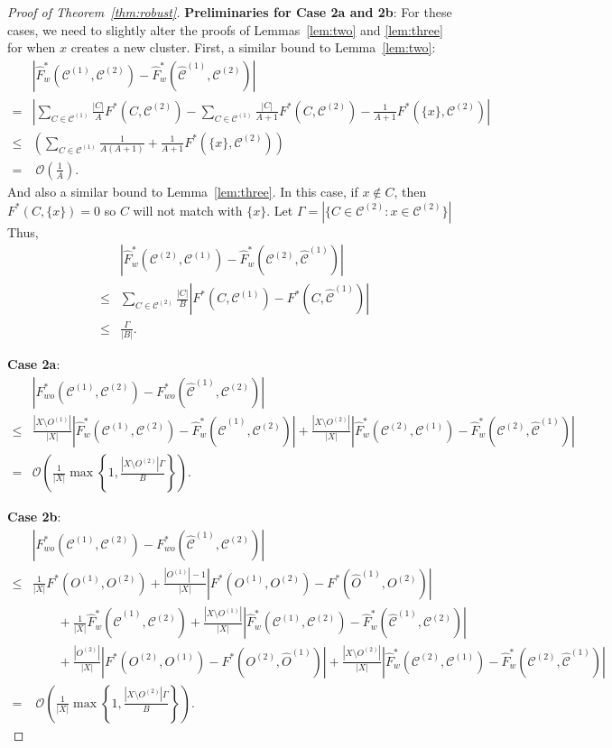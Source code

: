 \documentclass[10pt,a4paper]{amsart}
\newcommand{\bigO}{\mathcal{O}}
\newcommand\cCone{\mathcal{C}^{(1)}}
\newcommand\cCtwo{\mathcal{C}^{(2)}}
\newcommand\hcCone{\hat{\mathcal{C}}^{(1)}}
\begin{document}
\begin{proof}[Proof of Theorem~\ref{thm:robust}]
    \textbf{Preliminaries for Case 2a and 2b}:
    For these cases, we need to slightly alter the proofs of Lemmas~\ref{lem:two} and \ref{lem:three} for when $x$ creates a new cluster.
    First, a similar bound to Lemma~\ref{lem:two}:
    \begin{align*}
        & \left| \hat{F}^*_{w}(\cCone, \cCtwo) - \hat{F}^*_{w}(\hcCone, \cCtwo) \right| \\
        = & \left| \sum_{C \in \cCone} \frac{|C|}{A} F^*(C, \cCtwo) - \sum_{C \in \cCone} \frac{|C|}{A+1} F^*(C, \cCtwo) - \frac{1}{A+1} F^*(\{x\}, \cCtwo) \right| \\
        \leq & \left( \sum_{C \in \cCone} \frac{1}{A(A+1)} + \frac{1}{A+1} F^*(\{x\}, \cCtwo)\right) \\
        = & \; \bigO \left( \frac{1}{A} \right).
    \end{align*}
    And also a similar bound to Lemma~\ref{lem:three}.
    In this case, if $x \not \in C$, then $F^*(C, \{x\}) = 0$ so $C$ will not match with $\{x\}$.
    Let $\Gamma = |\{C \in \cCtwo : x \in \cCtwo\}|$
    Thus, 
    \begin{align*}
        & \left|\hat{F}^*_w(\cCtwo, \cCone) - \hat{F}^*_w(\cCtwo, \hcCone)\right|\\
        \leq & \sum_{C \in \cCtwo} \frac{|C|}{B} \left| F^*(C, \cCone) - F^*(C, \hcCone) \right| \\
        \leq & \frac{\Gamma}{|B|}.
    \end{align*}

    \textbf{Case 2a}:
    \begin{align*}
        & \left| F^*_{wo}(\cCone, \cCtwo) - F^*_{wo}(\hcCone, \cCtwo) \right| \\
        \leq & \frac{|X \setminus O^{(1)}|}{|X|}\left|\hat{F}^*_{w}(\cCone, \cCtwo) - \hat{F}^*_{w}(\hcCone, \cCtwo) \right| + \frac{|X \setminus O^{(2)}|}{|X|} \left| \hat{F}^*_w(\cCtwo, \cCone) - \hat{F}^*_w(\cCtwo, \hcCone) \right| \\
        = & \bigO \left( \frac{1}{|X|} \max \left\{ 1, \frac{|X \setminus O^{(2)}| \Gamma }{B} \right\} \right).
    \end{align*}

    \textbf{Case 2b}:
    \begin{align*}
        & \left| F^*_{wo}(\cCone, \cCtwo) - F^*_{wo}(\hcCone, \cCtwo) \right| \\
        \leq & \frac{1}{|X|}F^*(O^{(1)}, O^{(2)}) + \frac{|O^{(1)}|-1}{|X|}\left|F^*(O^{(1)}, O^{(2)}) - F^*(\hat{O}^{(1)}, O^{(2)})\right| \\
        & \qquad + \frac{1}{|X|}\hat{F}^*_w(\hcCone, \cCtwo) + \frac{|X \setminus O^{(1)}|}{|X|} \left|\hat{F}^*_w(\cCone, \cCtwo) - \hat{F}^*_w(\hcCone, \cCtwo)\right| \\
        & \qquad + \frac{|O^{(2)}|}{|X|}\left|F^*(O^{(2)}, O^{(1)}) - F^*(O^{(2)}, \hat{O}^{(1)}) \right| + \frac{|X \setminus O^{(2)}|}{|X|}\left| \hat{F}^*_w(\cCtwo, \cCone) - \hat{F}^*_w(\cCtwo, \hcCone)\right| \\
        = & \; \bigO \left( \frac{1}{|X|} \max \left\{ 1, \frac{|X \setminus O^{(2)}| \Gamma}{B} \right\} \right).
    \end{align*}
\end{proof}
\end{document}
